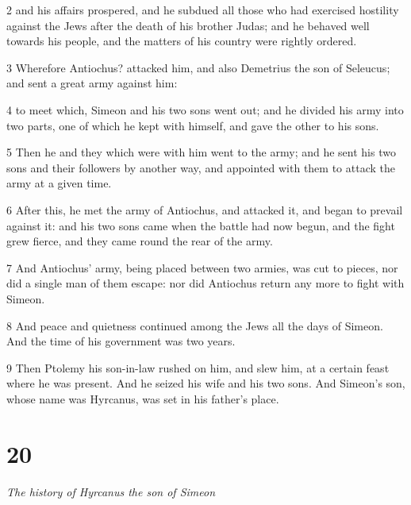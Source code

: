 \par 2 and his affairs prospered, and he subdued all those who had exercised hostility against the Jews after the death of his brother Judas; and he behaved well towards his people, and the matters of his country were rightly ordered. 

\par 3 Wherefore Antiochus? attacked him, and also Demetrius the son of Seleucus; and sent a great army against him: 

\par 4 to meet which, Simeon and his two sons went out; and he divided his army into two parts, one of which he kept with himself, and gave the other to his sons. 

\par 5 Then he and they which were with him went to the army; and he sent his two sons and their followers by another way, and appointed with them to attack the army at a given time. 

\par 6 After this, he met the army of Antiochus, and attacked it, and began to prevail against it: and his two sons came when the battle had now begun, and the fight grew fierce, and they came round the rear of the army. 

\par 7 And Antiochus’ army, being placed between two armies, was cut to pieces, nor did a single man of them escape: nor did Antiochus return any more to fight with Simeon. 

\par 8 And peace and quietness continued among the Jews all the days of Simeon. And the time of his government was two years. 

\par 9 Then Ptolemy his son-in-law rushed on him, and slew him, at a certain feast where he was present. And he seized his wife and his two sons. And Simeon’s son, whose name was Hyrcanus, was set in his father’s place. 

\par [Here ends the history as given in the two books usually attached to our Bibles.]

\chapter{20}

\par \textit{The history of Hyrcanus the son of Simeon}


